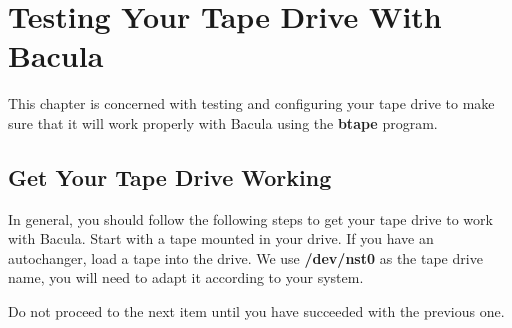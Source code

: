 
\chapter{Testing Your Tape Drive With Bacula}
\label{TapeTestingChapter}

This chapter is concerned with testing and configuring your tape drive to make
sure that it will work properly with Bacula using the {\bf btape} program.
\label{summary}

\section{Get Your Tape Drive Working}

In general, you should follow the following steps to get your tape drive to
work with Bacula. Start with a tape mounted in your drive. If you have an
autochanger, load a tape into the drive. We use {\bf /dev/nst0} as the tape
drive name, you will need to adapt it according to your system.

Do not proceed to the next item until you have succeeded with the previous
one.

